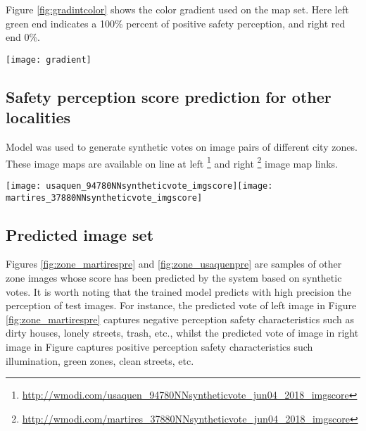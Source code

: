\documentclass{llncs}
\begin{document}
Figure \ref{fig:gradintcolor} shows the color gradient used on the map set. Here left green end indicates a 100\% percent of positive safety perception, and right red end 0\%. 

\begin{center}
	\centering
	\texttt{[image: gradient]}
	\label{fig:gradintcolor}
\end{center}

\subsection{Safety perception score prediction for other localities}
Model was used to generate synthetic votes on image pairs of different city zones. These image maps are available on line at left \footnote{\href{http://wmodi.com/usaquen\_94780NNsyntheticvote\_jun04\_2018\_imgscore}{http://wmodi.com/usaquen\_94780NNsyntheticvote\_jun04\_2018\_imgscore}} and right \footnote{\href{http://wmodi.com/martires\_37880NNsyntheticvote\_jun04\_2018\_imgscore}{http://wmodi.com/martires\_37880NNsyntheticvote\_jun04\_2018\_imgscore}} image map links.

\begin{center}
	\centering
	\texttt{[image: usaquen\_94780NNsyntheticvote\_imgscore]}\hspace{1.2mm}\texttt{[image: martires\_37880NNsyntheticvote\_imgscore]}
	\label{fig:zone_predictions}
\end{center}



\subsection{Predicted image set}
Figures \ref{fig:zone_martirespre} and \ref{fig:zone_usaquenpre} are samples of other zone images whose score has been predicted by the system based on synthetic votes. It is worth noting that the trained model predicts with high precision the perception of test images. For instance, the predicted vote of left image in Figure \ref{fig:zone_martirespre} captures negative perception safety characteristics such as dirty houses, lonely streets, trash, etc., whilst the predicted vote of image in right image in Figure \label{fig:zone_usaquenpre} captures positive perception safety characteristics such illumination, green zones, clean streets, etc.
\end{document}
